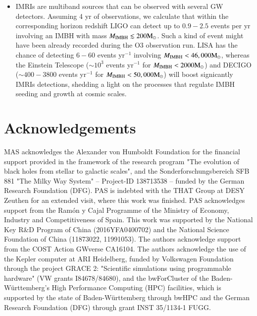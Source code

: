 \documentclass[article]{aa}
\newcommand{\Ms}{{\rm M}_\odot}
\newcommand{\ibh}{{\rm IMBH}}
\begin{document}
{\begin{itemize}
\item IMRIs are multiband sources that can be observed with several GW detectors. Assuming 4 yr of observations, we calculate that within the corresponding horizon redshift LIGO can detect up to $0.9-2.5$ events per yr involving an IMBH with mass $M_\ibh \lesssim 200\Ms$. Such a kind of event might have been already recorded during the O3 observation run. LISA has the chance of detecting $6-60$ events yr$^{-1}$ involving $M_\ibh < 46,000\Ms$, whereas the Einstein Telescope ($\sim 10^3$ events yr$^{-1}$ for $M_\ibh < 2000\Ms$) and DECIGO ($\sim 400-3800$ events yr$^{-1}$ for $M_\ibh < 50,000\Ms$) will boost signicantly IMRIs detections, shedding a light on the processes that regulate IMBH seeding and growth at cosmic scales.
\end{itemize}
}

\clearpage

\section*{Acknowledgements}

MAS acknowledges the Alexander von Humboldt Foundation for the financial
support provided in the framework of the research program "The evolution of
black holes from stellar to galactic scales", and the Sonderforschungsbereich
SFB 881 "The Milky Way System"  -- Project-ID 138713538 -- funded by the German
Research Foundation (DFG).  PAS is indebted with the THAT Group at DESY Zeuthen
for an extended visit, where this work was finished. PAS acknowledges support
from the Ram{\'o}n y Cajal Programme of the Ministry of Economy, Industry and
Competitiveness of Spain.  This work was supported by the National Key R\&D
Program of China (2016YFA0400702) and the National Science Foundation of China
(11873022, 11991053).  The authors acknowledge support from the COST Action
GWverse CA16104. The authors acknowledge the use of the Kepler computer at ARI
Heidelberg, funded by Volkswagen Foundation through the project GRACE 2:
"Scientific simulations using programmable hardware" (VW grants I84678/84680),
and the bwForCluster of the Baden-W\"urttemberg's High Performance Computing
(HPC) facilities, which is supported by the state of Baden-Württemberg through
bwHPC and the German Research Foundation (DFG) through grant INST 35/1134-1
FUGG.


\newpage
\footnotesize{

}
\end{document}
